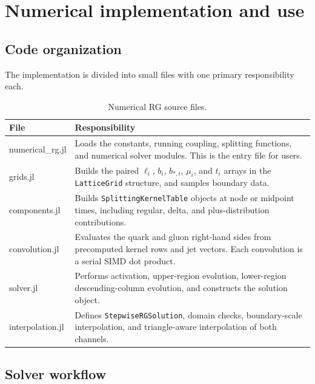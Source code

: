\section{Numerical implementation and use}
\label{sec:numerical-implementation}

\subsection{Code organization}

The implementation is divided into small files with one primary
responsibility each.

\begin{table}[H]
\centering
\caption{Numerical RG source files.}
\label{tab:source-files}
\begin{tabularx}{\textwidth}{@{}>{\ttfamily}l X@{}}
\toprule
\textrm{File} & \textrm{Responsibility}\\
\midrule
numerical\_rg.jl
  & Loads the constants, running coupling, splitting functions, and numerical
    solver modules. This is the entry file for users.\\
grids.jl
  & Builds the paired \(\ell_i\), \(b_i\), \(b_{*,i}\), \(\mu_i\), and \(t_i\)
    arrays in the \texttt{LatticeGrid} structure, and samples boundary data.\\
components.jl
  & Builds \texttt{SplittingKernelTable} objects at node or midpoint times,
    including regular, delta, and plus-distribution contributions.\\
convolution.jl
  & Evaluates the quark and gluon right-hand sides from precomputed kernel
    rows and jet vectors. Each convolution is a serial SIMD dot product.\\
solver.jl
  & Performs activation, upper-region evolution, lower-region
    descending-column evolution, and constructs the solution object.\\
interpolation.jl
  & Defines \texttt{StepwiseRGSolution}, domain checks, boundary-scale
    interpolation, and triangle-aware interpolation of both channels.\\
\bottomrule
\end{tabularx}
\end{table}

\subsection{Solver workflow}


